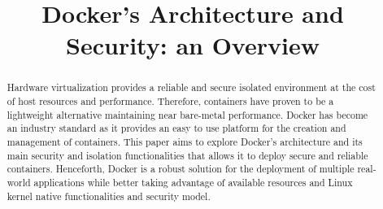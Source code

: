 \documentclass[conference]{IEEEtran}
\begin{document}
\title{Docker's Architecture and Security: an Overview}

\author{
}

\maketitle

\begin{abstract}
    Hardware virtualization provides a reliable and secure isolated environment at the cost of host resources and performance. Therefore, containers have proven to be a lightweight alternative maintaining near bare-metal performance. Docker has become an industry standard as it provides an easy to use platform for the creation and management of containers. This paper aims to explore Docker's architecture and its main security and isolation functionalities that allows it to deploy secure and reliable containers. Henceforth, Docker is a robust solution for the deployment of multiple real-world applications while better taking advantage of available resources and Linux kernel native functionalities and security model.
\end{abstract}









\end{document}
